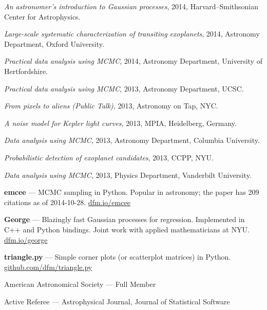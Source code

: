 \documentclass[12pt,letterpaper]{article}
\begin{document}
\begin{list}{}{\cvlist}
\item \emph{An astronomer's introduction to Gaussian processes},
    2014, Harvard--Smithsonian Center for Astrophysics.

\item \emph{Large-scale systematic characterization of transiting exoplanets},
    2014, Astronomy Department, Oxford University.

\item \emph{Practical data analysis using MCMC},
    2014, Astronomy Department, University of Hertfordshire.

\item \emph{Practical data analysis using MCMC},
    2013, Astronomy Department, UCSC.

\item \emph{From pixels to aliens (Public Talk)},
    2013, Astronomy on Tap, NYC.

\item \emph{A noise model for Kepler light curves},
    2013, MPIA, Heidelberg, Germany.

\item \emph{Data analysis using MCMC},
    2013, Astronomy Department, Columbia University.

\item \emph{Probabilistic detection of exoplanet candidates},
    2013, CCPP, NYU.

\item \emph{Data analysis using MCMC},
    2013, Physics Department, Vanderbilt University.
\end{list}

\newpage

\begin{list}{}{\cvlist}

\item {\bf emcee} ---
    MCMC sampling in Python. Popular in astronomy; the paper has 209 citations
    as of 2014-10-28. \url{dfm.io/emcee}

\item {\bf George} ---
    Blazingly fast Gaussian processes for regression. Implemented in C++ and
    Python bindings. Joint work with applied mathematicians at NYU.
    \url{dfm.io/george}

\item {\bf triangle.py} ---
    Simple corner plots (or scatterplot matrices) in Python.
    \url{github.com/dfm/triangle.py}


\end{list}


\begin{list}{}{\cvlist}
\item American Astronomical Society --- Full Member
\item Active Referee --- Astrophysical Journal, Journal of Statistical Software
\end{list}
\end{document}
